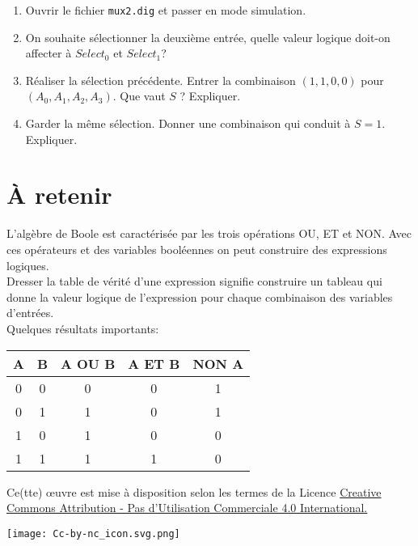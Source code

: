 \documentclass[11pt,french]{article}
\makeatletter
\def\maxwidth{\ifdim\Gin@nat@width>\linewidth\linewidth
    \else\Gin@nat@width\fi}
\let\Oldincludegraphics\includegraphics
\renewcommand{\includegraphics}[1]{\Oldincludegraphics[width=.8\maxwidth]{#1}}
\providecommand{\tightlist}{%
      \setlength{\itemsep}{0pt}\setlength{\parskip}{0pt}}
\makeatother
\begin{document}
\begin{enumerate}
\item
  Ouvrir le fichier \texttt{mux2.dig} et passer en mode simulation.
\item
  On souhaite sélectionner la deuxième entrée, quelle valeur logique doit-on affecter à \(Select_0\) et \(Select_1\)?
\item
  Réaliser la sélection précédente. Entrer la combinaison \((1,1,0,0)\)
  pour \((A_0,A_1,A_2,A_3)\). Que vaut \(S\) ? Expliquer.
\item
  Garder la même sélection. Donner une combinaison qui conduit à
  \(S=1\). Expliquer.
\end{enumerate}

    \hypertarget{uxe0-retenir}{%
\section{À retenir}\label{uxe0-retenir}}

L'algèbre de Boole est caractérisée par les trois opérations OU, ET et
NON. Avec ces opérateurs et des variables booléennes on peut construire
des expressions logiques.\\
Dresser la table de vérité d'une expression signifie construire un
tableau qui donne la valeur logique de l'expression pour chaque
combinaison des variables d'entrées.\\
Quelques résultats importants:

	\begin{center}
\begin{tabular}{|c|c||c|c|c|}
	\hline
	A & B & A OU B & A ET B& NON A\\
	\hline
	0 & 0 & 0 & 0 & 1\\
	\hline
	0 & 1 & 1 & 0 & 1\\
	\hline
	1 & 0 & 1 & 0 & 0\\
	\hline
	1 & 1 & 1 & 1 & 0\\
	\hline
\end{tabular}
\end{center}
\vspace{1cm} 
    Ce(tte) œuvre est mise à disposition selon les termes de la Licence
\href{https://creativecommons.org/licenses/by-nc/4.0/}{Creative Commons Attribution - Pas d'Utilisation Commerciale 4.0
International.}
\begin{center}
\texttt{[image: Cc-by-nc\_icon.svg.png]}
\end{center}    
    
\end{document}
